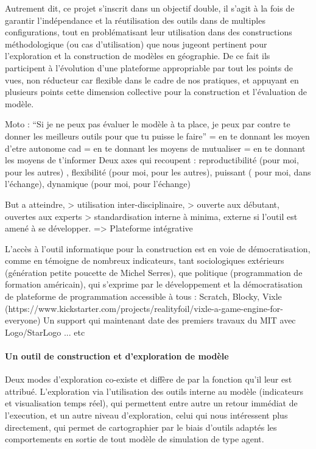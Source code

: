 Autrement dit, ce projet s'inscrit dans un objectif double, il s'agit à la fois de garantir l'indépendance et la réutilisation des outils dans de multiples configurations, tout en problématisant leur utilisation dans des constructions méthodologique (ou cas d'utilisation) que nous jugeont pertinent pour l'exploration et la construction de modèles en géographie. De ce fait ils participent à l'évolution d'une plateforme appropriable par tout les points de vues, non réducteur car flexible dans le cadre de nos pratiques, et appuyant en plusieurs points cette dimension collective pour la construction et l'évaluation de modèle.

Moto : \enquote{Si je ne peux pas évaluer le modèle à ta place, je peux par contre te donner les meilleurs outils pour que tu puisse le faire} 
= en te donnant les moyen d'etre autonome cad
= en te donnant les moyens de mutualiser
= en te donnant les moyens de t'informer 
Deux axes qui recoupent : reproductibilité (pour moi, pour les autres) , flexibilité (pour moi, pour les autres), puissant ( pour moi, dans l'échange), dynamique (pour moi, pour l'échange)

But a atteindre, 
> utilisation inter-disciplinaire, 
> ouverte aux débutant, ouvertes aux experts
> standardisation interne à minima, externe si l'outil est amené à se développer.
=> Plateforme intégrative 

L'accès à l'outil informatique pour la construction est en voie de démocratisation, comme en témoigne de nombreux indicateurs, tant sociologiques extérieurs (génération petite poucette de Michel Serres), que politique (programmation de formation américain), qui s'exprime par le développement et la démocratisation de plateforme de programmation accessible à tous : Scratch, Blocky, Vixle (https://www.kickstarter.com/projects/realityfoil/vixle-a-game-engine-for-everyone)
Un support qui maintenant date des premiers travaux du MIT avec Logo/StarLogo ... etc

\paragraph{Un outil de \textbf{construction} et d'\textbf{exploration} de modèle}

Deux modes d'exploration co-existe et diffère de par la fonction qu'il leur est attribué. L'exploration via l'utilisation des outils interne au modèle (indicateurs et visualisation temps réel), qui permettent entre autre un retour immédiat de l'execution, et un autre niveau d'exploration, celui qui nous intéressent plus directement, qui permet de cartographier par le biais d'outils adaptés les comportements en sortie de tout modèle de simulation de type agent. 


